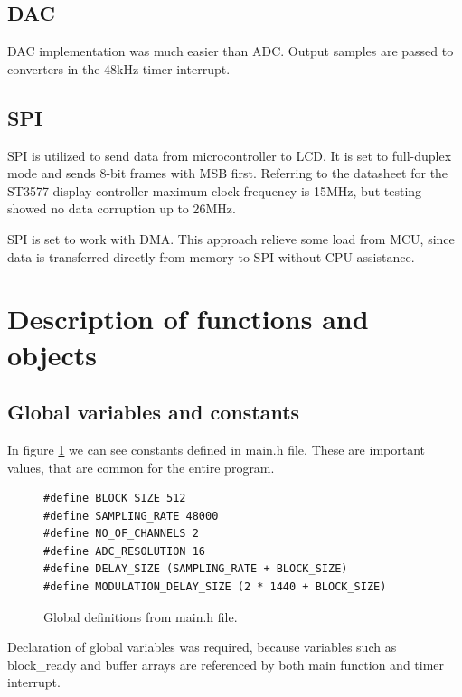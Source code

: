 \documentclass[a4paper,twoside,12pt]{book}
\begin{document}
\subsection{DAC}
DAC implementation was much easier than ADC.
Output samples are passed to converters in the 48kHz timer interrupt.

\subsection{SPI}
SPI is utilized to send data from microcontroller to LCD.
It is set to full-duplex mode and sends 8-bit frames with MSB first.
Referring to the datasheet for the ST3577 display controller
maximum clock frequency is 15MHz,
but testing showed no data corruption up to 26MHz.
\cite{Sitronix:ST7735}

SPI is set to work with DMA.
This approach relieve some load from MCU,
since data is transferred directly from memory
to SPI without CPU assistance.

\section{Description of functions and objects}

\subsection{Global variables and constants}
In figure \ref{fig:defs} we can see constants defined in main.h file.
These are important values, that are common for the entire program.

\begin{figure}[H]
\centering
\begin{lstlisting}
#define BLOCK_SIZE 512
#define SAMPLING_RATE 48000
#define NO_OF_CHANNELS 2
#define ADC_RESOLUTION 16
#define DELAY_SIZE (SAMPLING_RATE + BLOCK_SIZE)
#define MODULATION_DELAY_SIZE (2 * 1440 + BLOCK_SIZE)
\end{lstlisting}
\caption{Global definitions from main.h file.}
\label{fig:defs}
\end{figure}

Declaration of global variables was required, because
variables such as block\_ready and buffer arrays are referenced by
both main function and timer interrupt.
\end{document}
